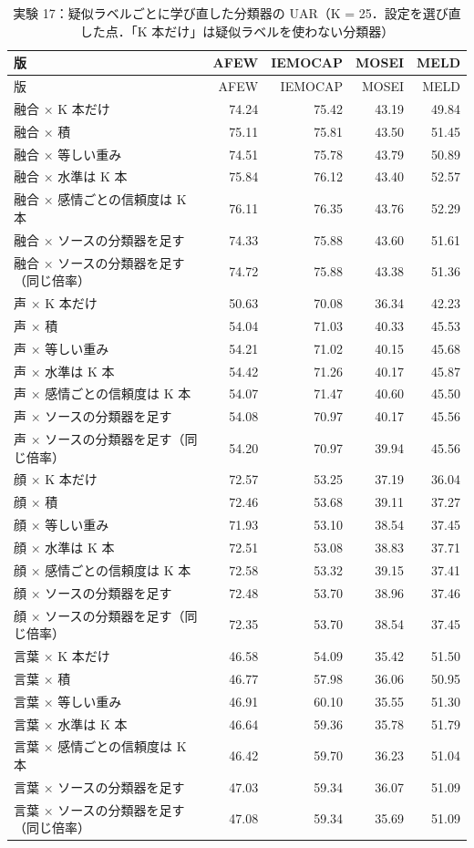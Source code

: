 \begin{longtable}{>{\raggedright}p{8.2cm}rrrr}
\caption{実験 17：疑似ラベルごとに学び直した分類器の UAR（K = 25．設定を選び直した点．「K 本だけ」は疑似ラベルを使わない分類器）}\\
\toprule
版 & AFEW & IEMOCAP & MOSEI & MELD \\
\midrule
\endfirsthead
\toprule
版 & AFEW & IEMOCAP & MOSEI & MELD \\
\midrule
\endhead
\bottomrule
\endfoot

融合 × K 本だけ & 74.24 & 75.42 & 43.19 & 49.84 \\
融合 × 積 & 75.11 & 75.81 & 43.50 & 51.45 \\
融合 × 等しい重み & 74.51 & 75.78 & 43.79 & 50.89 \\
融合 × 水準は K 本 & 75.84 & 76.12 & 43.40 & 52.57 \\
融合 × 感情ごとの信頼度は K 本 & 76.11 & 76.35 & 43.76 & 52.29 \\
融合 × ソースの分類器を足す & 74.33 & 75.88 & 43.60 & 51.61 \\
融合 × ソースの分類器を足す（同じ倍率） & 74.72 & 75.88 & 43.38 & 51.36 \\
\midrule
声 × K 本だけ & 50.63 & 70.08 & 36.34 & 42.23 \\
声 × 積 & 54.04 & 71.03 & 40.33 & 45.53 \\
声 × 等しい重み & 54.21 & 71.02 & 40.15 & 45.68 \\
声 × 水準は K 本 & 54.42 & 71.26 & 40.17 & 45.87 \\
声 × 感情ごとの信頼度は K 本 & 54.07 & 71.47 & 40.60 & 45.50 \\
声 × ソースの分類器を足す & 54.08 & 70.97 & 40.17 & 45.56 \\
声 × ソースの分類器を足す（同じ倍率） & 54.20 & 70.97 & 39.94 & 45.56 \\
\midrule
顔 × K 本だけ & 72.57 & 53.25 & 37.19 & 36.04 \\
顔 × 積 & 72.46 & 53.68 & 39.11 & 37.27 \\
顔 × 等しい重み & 71.93 & 53.10 & 38.54 & 37.45 \\
顔 × 水準は K 本 & 72.51 & 53.08 & 38.83 & 37.71 \\
顔 × 感情ごとの信頼度は K 本 & 72.58 & 53.32 & 39.15 & 37.41 \\
顔 × ソースの分類器を足す & 72.48 & 53.70 & 38.96 & 37.46 \\
顔 × ソースの分類器を足す（同じ倍率） & 72.35 & 53.70 & 38.54 & 37.45 \\
\midrule
言葉 × K 本だけ & 46.58 & 54.09 & 35.42 & 51.50 \\
言葉 × 積 & 46.77 & 57.98 & 36.06 & 50.95 \\
言葉 × 等しい重み & 46.91 & 60.10 & 35.55 & 51.30 \\
言葉 × 水準は K 本 & 46.64 & 59.36 & 35.78 & 51.79 \\
言葉 × 感情ごとの信頼度は K 本 & 46.42 & 59.70 & 36.23 & 51.04 \\
言葉 × ソースの分類器を足す & 47.03 & 59.34 & 36.07 & 51.09 \\
言葉 × ソースの分類器を足す（同じ倍率） & 47.08 & 59.34 & 35.69 & 51.09 \\
\midrule
\end{longtable}
